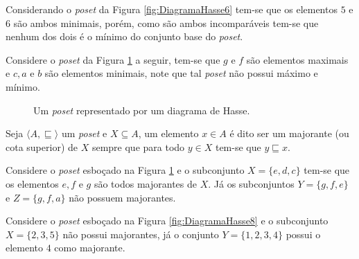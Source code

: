 \begin{exemplo}
Considerando o \textit{poset} da Figura \ref{fig:DiagramaHasse6} tem-se que os elementos $5$ e $6$ são ambos minimais, porém, como são ambos incomparáveis tem-se que nenhum dos dois é o mínimo do conjunto base do \textit{poset}.
\end{exemplo}

\begin{exemplo}
Considere o \textit{poset} da Figura \ref{fig:DiagramaHasse9} a seguir, tem-se que $g$ e $f$ são elementos maximais e $c, a$ e $b$ são elementos minimais, note que tal \textit{poset} não possui máximo e mínimo.
\end{exemplo}

\begin{figure}[h]
\centering
{}
\caption{Um \textit{poset} representado por um diagrama de Hasse.}
\label{fig:DiagramaHasse9}
\end{figure}

\begin{definicao}[Majorante]\label{def:Majorante}
	Seja $\langle A, \sqsubseteq \rangle$ um \textit{poset} e $X \subseteq A$, um elemento $x \in A$ é dito ser um majorante (ou cota superior) de $X$ sempre que para todo $y \in X$ tem-se que $y\sqsubseteq x$.
\end{definicao}

\begin{exemplo}
	Considere o \textit{poset} esboçado na Figura \ref{fig:DiagramaHasse9} e o subconjunto $X = \{e, d, c\}$ tem-se que os elementos $e, f$ e $g$ são todos majorantes de $X$. Já os subconjuntos $Y = \{g, f, e\}$ e $Z = \{g, f, a\}$ não possuem majorantes.
\end{exemplo}

\begin{exemplo}
	Considere o \textit{poset} esboçado na Figura \ref{fig:DiagramaHasse8} e o subconjunto $X = \{2, 3, 5\}$  não possui majorantes, já o conjunto $Y = \{1,2, 3, 4\}$ possui o elemento $4$ como majorante.
\end{exemplo}


